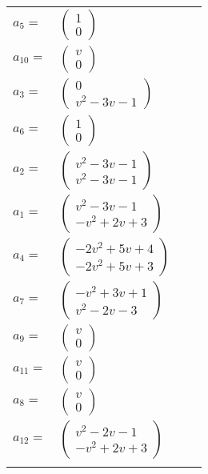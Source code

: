\documentclass[1p]{elsarticle_modified}
\theoremstyle{definition}
\begin{document}
\begin{tabular}{m{7pt} m{180pt} m{7pt} m{180pt} }
\flushright $a_{5}=$&$\begin{pmatrix}1\\0\end{pmatrix}$ \\
\flushright $a_{10}=$&$\begin{pmatrix}v\\0\end{pmatrix}$ \\
\flushright $a_{3}=$&$\begin{pmatrix}0\\v^2-3 v-1\end{pmatrix}$ \\
\flushright $a_{6}=$&$\begin{pmatrix}1\\0\end{pmatrix}$ \\
\flushright $a_{2}=$&$\begin{pmatrix}v^2-3 v-1\\v^2-3 v-1\end{pmatrix}$ \\
\flushright $a_{1}=$&$\begin{pmatrix}v^2-3 v-1\\- v^2+2 v+3\end{pmatrix}$ \\
\flushright $a_{4}=$&$\begin{pmatrix}-2 v^2+5 v+4\\-2 v^2+5 v+3\end{pmatrix}$ \\
\flushright $a_{7}=$&$\begin{pmatrix}- v^2+3 v+1\\v^2-2 v-3\end{pmatrix}$ \\
\flushright $a_{9}=$&$\begin{pmatrix}v\\0\end{pmatrix}$ \\
\flushright $a_{11}=$&$\begin{pmatrix}v\\0\end{pmatrix}$ \\
\flushright $a_{8}=$&$\begin{pmatrix}v\\0\end{pmatrix}$ \\
\flushright $a_{12}=$&$\begin{pmatrix}v^2-2 v-1\\- v^2+2 v+3\end{pmatrix}$\\&\end{tabular}
\end{document}
